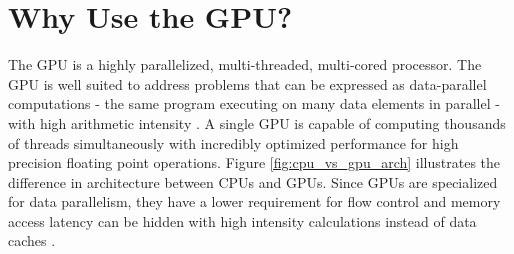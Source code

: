 \section{Why Use the GPU?}
The GPU is a highly parallelized, multi-threaded, multi-cored processor.  The GPU is well suited to address problems that can be expressed as data-parallel computations - the same program executing on many data elements in parallel - with high arithmetic intensity \cite{Nvidia08}.  A single GPU is capable of computing thousands of threads simultaneously with incredibly optimized performance for high precision floating point operations.  Figure \ref{fig:cpu_vs_gpu_arch} illustrates the difference in architecture between CPUs and GPUs.  Since GPUs are specialized for data parallelism, they have a lower requirement for flow control and memory access latency can be hidden with high intensity calculations instead of data caches \cite{Nvidia08}.

